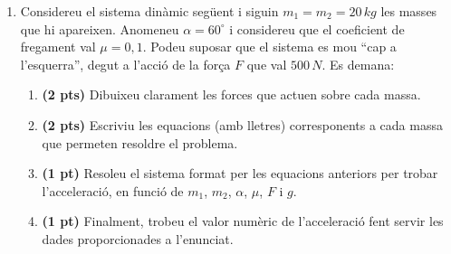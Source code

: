 \documentclass[a4paper,12pt]{article}
\begin{document}
\begin{enumerate}
\item
 Considereu el sistema dinàmic següent i siguin $m_{1}=m_{2}=20\,kg$ les masses que hi apareixen. Anomeneu $\alpha=60^{\circ}$ i considereu que el coeficient de fregament val $\mu=0,1$. Podeu suposar que el sistema es mou ``cap a l'esquerra'', degut a l'acció de la força $F$ que val $500\,N$. Es demana: 
\begin{enumerate}
\item 
\textbf{(2 pts)} Dibuixeu clarament les forces que actuen sobre cada massa.
\item
\textbf{(2 pts)} Escriviu les equacions (amb lletres) corresponents a cada massa que permeten resoldre el problema.
\item
\textbf{(1 pt)} Resoleu el sistema format per les equacions anteriors per trobar l'acceleració, en funció de $m_{1}$, $m_{2}$, $\alpha$, $\mu$, $F$ i $g$.
\item
\textbf{(1 pt)}
Finalment, trobeu el valor numèric de l'acceleració fent servir les dades proporcionades a l'enunciat. 
\end{enumerate}
\begin{center}
\end{center}
\end{enumerate}
\end{document}
